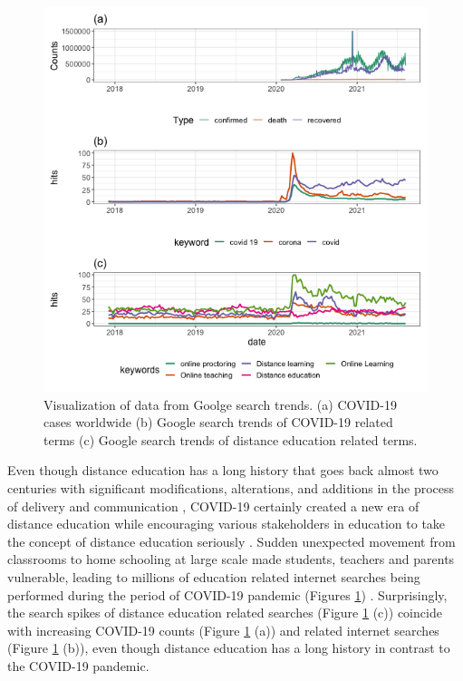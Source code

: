 \documentclass[11pt,a4paper,]{article}
\begin{document}
\begin{figure}[h]

{\centering \includegraphics[width=1\textwidth]{figure/distanceLearningWorldAnalysis-1} 

}

\caption{Visualization of data from Goolge search trends. (a) COVID-19 cases worldwide (b) Google search trends of COVID-19 related terms (c) Google search trends of distance education related terms.}\label{fig:distanceLearningWorldAnalysis}
\end{figure}

Even though distance education has a long history that goes back almost two centuries with significant modifications,
alterations, and additions in the process of delivery and communication \autocite{moore2011learning,spector2014handbook}, COVID-19 certainly created a new era of distance education while encouraging various stakeholders in education to take the concept of distance education seriously \autocite{richmond2020critical}. Sudden unexpected movement from classrooms to home schooling at large scale made students, teachers and parents vulnerable, leading to millions of education related internet searches being performed during the period of COVID-19 pandemic (Figures \ref{fig:distanceLearningWorldAnalysis}) \autocite{carter2021teacher}. Surprisingly, the search spikes of distance education related searches (Figure \ref{fig:distanceLearningWorldAnalysis} (c)) coincide with increasing COVID-19 counts (Figure \ref{fig:distanceLearningWorldAnalysis} (a)) and related internet searches (Figure \ref{fig:distanceLearningWorldAnalysis} (b)), even though distance education has a long history in contrast to the COVID-19 pandemic.
\end{document}
